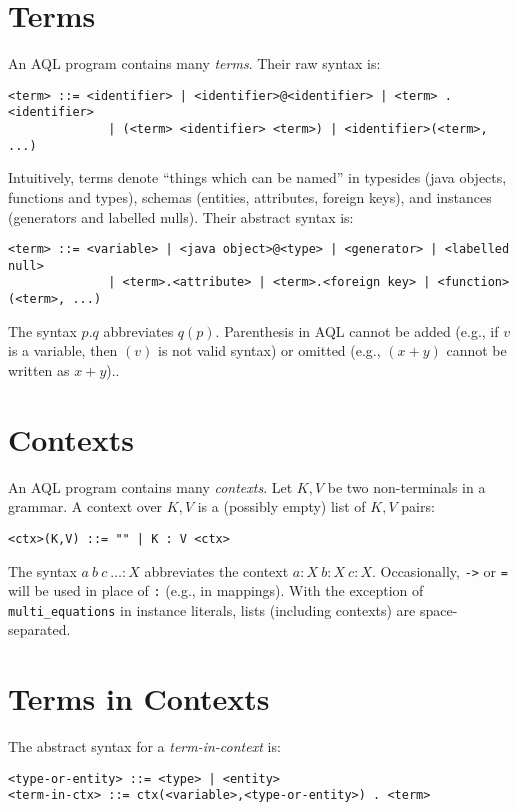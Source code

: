 \documentclass[10pt]{book}
\begin{document}
\section{Terms}

An AQL program contains many {\it terms}.  Their raw syntax is:

\begin{verbatim}
<term> ::= <identifier> | <identifier>@<identifier> | <term> . <identifier>
              | (<term> <identifier> <term>) | <identifier>(<term>, ...) 
\end{verbatim}

Intuitively, terms denote ``things which can be named'' in typesides (java objects, functions and types), schemas (entities, attributes, foreign keys), and instances (generators and labelled nulls).  Their abstract syntax is: 
\begin{verbatim}
<term> ::= <variable> | <java object>@<type> | <generator> | <labelled null> 
              | <term>.<attribute> | <term>.<foreign key> | <function>(<term>, ...) 
\end{verbatim}

The syntax $p.q$ abbreviates $q(p)$.  Parenthesis in AQL cannot be added (e.g., if $v$ is a variable, then $(v)$ is not valid syntax) or omitted (e.g., $(x + y)$ cannot be written as $x + y$)..  

\section{Contexts}

An AQL program contains many {\it contexts}.  Let $K,V$ be two non-terminals in a grammar.  A context over $K,V$ is a (possibly empty) list of $K,V$ pairs:
\begin{verbatim}
<ctx>(K,V) ::= "" | K : V <ctx>
\end{verbatim} 

The syntax $a \ b \ c \ \ldots : X$ abbreviates the context $a:X \ b:X \ c:X$.  Occasionally, {\tt ->} or {\tt =} will be used in place of {\tt :} (e.g., in mappings).  With the exception of {\tt multi\_equations} in instance literals, lists (including contexts) are space-separated.

\section{Terms in Contexts}
The abstract syntax for a {\it term-in-context} is: 
\begin{verbatim}
<type-or-entity> ::= <type> | <entity>
<term-in-ctx> ::= ctx(<variable>,<type-or-entity>) . <term>
\end{verbatim}
\end{document}
